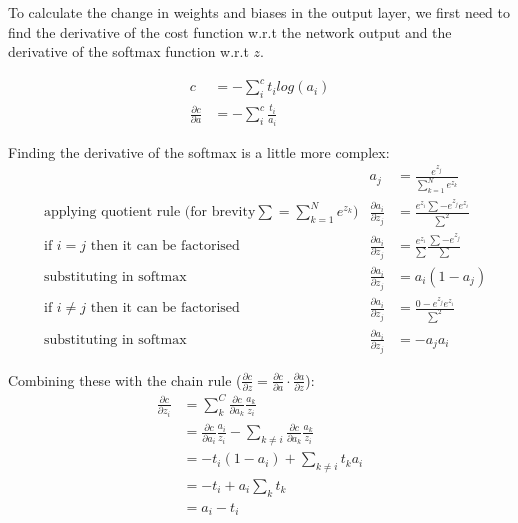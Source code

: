 To calculate the change in weights and biases in the output layer, we first need
to find the derivative of the cost function w.r.t the network output and the
derivative of the softmax function w.r.t \(z\).

\begin{equation}
    \begin{aligned}
        c &= - \sum_{i}^{c} t_{i}log(a_{i}) \\
        \frac{\partial c}{\partial a} &= - \sum_{i}^{c} \frac{t_{i}}{a_{i}}
    \end{aligned}
\end{equation}

Finding the derivative of the softmax is a little more complex:
\begin{equation}
    \begin{aligned}
        &       &   a_{j} &= \frac{e^{z_{j}}}{\sum_{k=1}^{N} e^{z_{k}}} \\
        &\text{applying quotient rule (for brevity} \sum = \sum_{k=1}^{N} e^{z_{k}} \text{)}   &   \frac{\partial a_{i}}{\partial z_{j}} &= \frac{e^{z_{i}} \sum - e^{z_{j}}e^{z_{i}}}{\sum^{2}}\\[2em]
        &\text{if } i=j \text{ then it can be factorised}     &   \frac{\partial a_{i}}{\partial z_{j}} &= \frac{e^{z_{i}}}{\sum} \frac{\sum - e^{z_{j}}}{\sum}\\
        &\text{substituting in softmax}     &   \frac{\partial a_{i}}{\partial z_{j}} &= a_{i} (1 - a_{j})\\[2em]
        &\text{if } i \neq j \text{ then it can be factorised}      &   \frac{\partial a_{i}}{\partial z_{j}} &= \frac{0 - e^{z_{j}}e^{z_{i}}}{\sum^{2}}\\
        &\text{substituting in softmax}     &   \frac{\partial a_{i}}{\partial z_{j}} &= -a_{j}a_{i}
    \end{aligned}
\end{equation}

Combining these with the chain rule (\(\frac{\partial c}{\partial z} = \frac{\partial c}{\partial a} \cdot \frac{\partial a}{\partial z}\)):
\begin{equation}
    \begin{aligned}
        \frac{\partial c}{\partial z_{i}} &= \sum_{k}^{C} \frac{\partial c}{\partial a_{k}} \frac{a_{k}}{z_{i}}\\
        &= \frac{\partial c}{\partial a_{i}} \frac{a_{i}}{z_{i}} - \sum_{k \neq i} \frac{\partial c}{\partial a_{k}} \frac{a_{k}}{z_{i}}\\
        &= - t_{i}(1 - a_{i}) + \sum_{k \neq i} t_{k}a_{i}\\
        &= - t_{i} + a_{i} \sum_{k} t_{k}\\
        &= a_{i} - t_{i}
    \end{aligned}
\end{equation}


